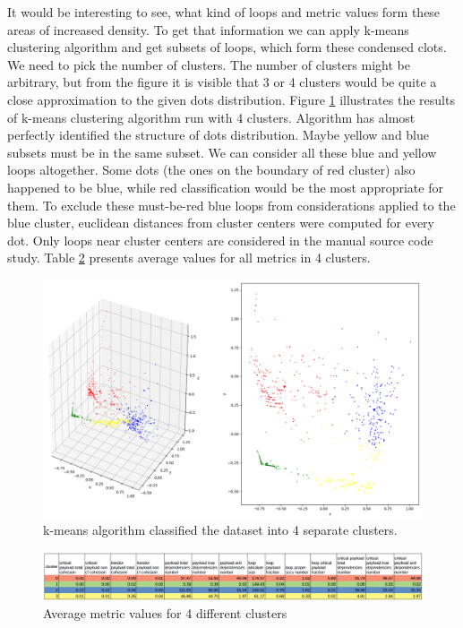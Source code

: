 \null\qquad It would be interesting to see, what kind of loops and metric values form these areas of increased density. To get that information we can apply k-means clustering algorithm and get subsets of loops, which form these condensed clots. We need to pick the number of clusters. The number of clusters might be arbitrary, but from the figure it is visible that 3 or 4 clusters would be quite a close approximation to the given dots distribution. Figure \ref{metrics-4-clusters} illustrates the results of k-means clustering algorithm run with 4 clusters. Algorithm has almost perfectly identified the structure of dots distribution. Maybe yellow and blue subsets must be in the same subset. We can consider all these blue and yellow loops altogether. Some dots (the ones on the boundary of red cluster) also happened to be blue, while red classification would be the most appropriate for them. To exclude these must-be-red blue loops from considerations applied to the blue cluster, euclidean distances from cluster centers were computed for every dot. Only loops near cluster centers are considered in the manual source code study. Table \ref{clusters-metric-values} presents average values for all metrics in 4 clusters. \newline
\begin{figure}[htb]
\centering
\includegraphics[width=\linewidth]{figs/metrics-4-clusters.png}
\caption{k-means algorithm classified the dataset into 4 separate clusters.}
\label{metrics-4-clusters}
\end{figure}
\begin{figure}[htb]
\centering
\includegraphics[width=\linewidth]{figs/clusters-metric-values.png}
\caption{Average metric values for 4 different clusters}
\label{clusters-metric-values}
\end{figure} \newline 
